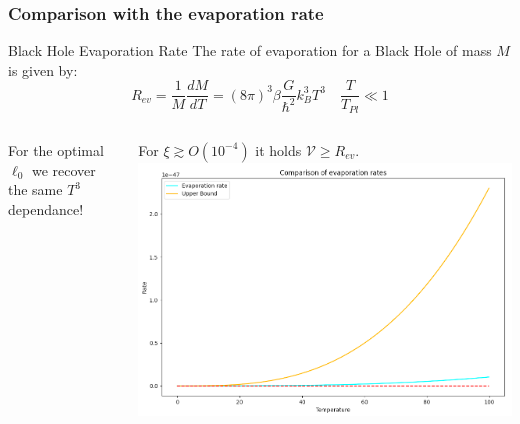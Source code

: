 \documentclass[handout]{beamer}
\begin{document}
	\begin{frame}
		\frametitle{Comparison with the evaporation rate}
		\begin{theoblock}{Black Hole Evaporation Rate}
			The rate of evaporation for a Black Hole of mass \(M\) is given by:
			\[
			R_{ev} = \frac{1}{M}\frac{dM}{dT} = (8\pi)^3\beta \frac{G}{\hbar^2} k_B^3T^3 \quad \frac{T}{T_{Pl}} \ll 1
			\]
		\end{theoblock}
		
		
		\begin{columns}
			\begin{ideablock}{}
				For the optimal \(\ell_0\) we recover the same \(T^3\) dependance!
			\end{ideablock}
			

			For \(\xi \gtrsim O(10^{-4})\) it holds \(\mathcal{V} \ge R_{ev}\).
			\centering
			\includegraphics[scale=0.2]{Immagini/ev-rate-conformal.png}
		\end{columns}

	\end{frame}

	
\end{document}
